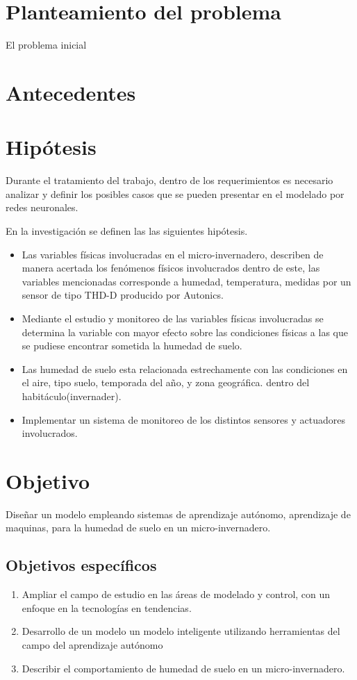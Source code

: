 \section{Planteamiento del problema} 
El problema inicial
\section{Antecedentes}


\section{Hipótesis}
Durante el tratamiento del trabajo, dentro de los requerimientos es necesario
analizar y definir los posibles casos que se pueden presentar en el modelado
por redes neuronales. 

    
En la investigación se definen las las siguientes hipótesis. 
\begin{itemize}
    \item {Las variables físicas involucradas en el micro-invernadero,
        describen de manera acertada los fenómenos físicos involucrados dentro
        de este, las variables mencionadas corresponde a humedad, temperatura,
    medidas por un sensor de tipo THD-D producido por Autonics.}
    \item {Mediante el estudio y monitoreo de las variables físicas
           involucradas se determina la variable con mayor efecto sobre las
           condiciones físicas a las que se pudiese encontrar sometida la humedad de
           suelo.}
    \item {Las humedad de suelo esta relacionada estrechamente con las
        condiciones en el aire, tipo suelo, temporada del año, y zona
    geográfica.  dentro del habitáculo(invernader).}
\item {Implementar un sistema de monitoreo de los distintos sensores y
    actuadores involucrados.}
\end{itemize}
\section{Objetivo}
Diseñar un modelo empleando sistemas de aprendizaje autónomo, aprendizaje de
maquinas, para la humedad de suelo en un micro-invernadero.
\subsection{Objetivos específicos}
\begin{enumerate}
    \item {Ampliar el campo de estudio en las áreas de modelado y control, con
        un enfoque en la tecnologías en tendencias.}
    \item {Desarrollo de un modelo un modelo   inteligente utilizando
        herramientas del campo del aprendizaje autónomo}
    \item Describir el comportamiento de humedad de suelo en un
        micro-invernadero. 
\end{enumerate}
